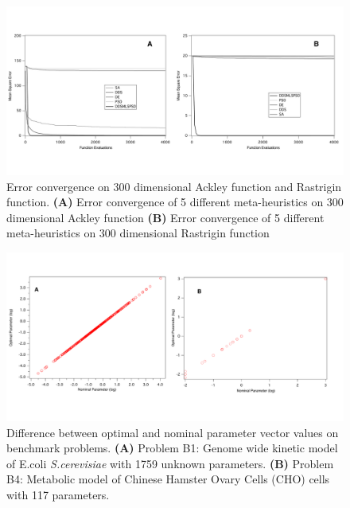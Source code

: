 \documentclass[12pt]{article}
\begin{document}
\setcounter{equation}{0}
\setcounter{table}{0}
\setcounter{figure}{0}
\setcounter{page}{1}

\begin{figure}[ht]
\centering
\includegraphics[width=1.02\textwidth,height=0.5\textheight]{./figs/Figure_6_Ackley_Rast}
\caption{Error convergence on 300 dimensional Ackley function and Rastrigin function. \textbf {(A)} Error convergence of 5 different meta-heuristics on 300 dimensional Ackley function \textbf {(B)} Error convergence of 5 different meta-heuristics on 300 dimensional Rastrigin function
}\label{fig-testfunctions}
\end{figure}



\begin{figure}[ht]
\centering
\includegraphics[width=1.02\textwidth,height=0.5\textheight]{./figs/Figure_7_Benchmarks_Parameters}
\caption{Difference between optimal and nominal parameter vector values on benchmark problems. \textbf {(A)} Problem B1: Genome wide kinetic model of E.coli \textit{S.cerevisiae} with 1759 unknown parameters. \textbf {(B)} Problem B4: Metabolic model of Chinese  Hamster Ovary Cells (CHO) cells with 117 parameters.
}\label{fig-benchmark}
\end{figure}
\end{document}
